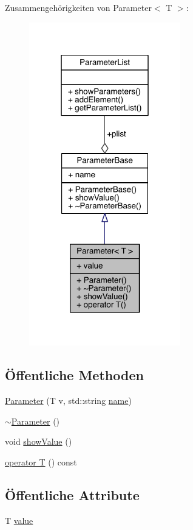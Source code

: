 Zusammengehörigkeiten von Parameter$<$ T $>$\+:
\nopagebreak
\begin{figure}[H]
\begin{center}
\leavevmode
\includegraphics[width=187pt]{class_parameter__coll__graph}
\end{center}
\end{figure}
\subsection*{Öffentliche Methoden}
\begin{DoxyCompactItemize}
\item 
\hyperlink{class_parameter_a0043f636d495e3cd40686c35b0108059}{Parameter} (T v, std\+::string \hyperlink{class_parameter_base_a3e2e2ad34b89eabb0484b3a338133614}{name})
\item 
\hyperlink{class_parameter_a66e9872be5c4d3b49007c5be61ec5620}{$\sim$\+Parameter} ()
\item 
void \hyperlink{class_parameter_ab0091864db90216ee76ee9084422b380}{show\+Value} ()
\item 
\hyperlink{class_parameter_acd26e6a88234a14e642bfbcc8e3f5968}{operator T} () const
\end{DoxyCompactItemize}
\subsection*{Öffentliche Attribute}
\begin{DoxyCompactItemize}
\item 
T \hyperlink{class_parameter_a5dcbb3f478f204d7931eec2b3ed66117}{value}
\end{DoxyCompactItemize}


